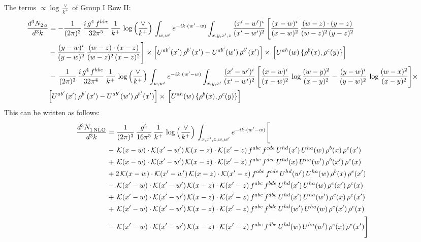 \documentclass[9pt]{article}
\numberwithin{equation}{section}
\begin{document}
{\color{blue}\noindent The terms $\propto\log\frac{\vee}{k^+}$ of Group I Row II:
\begin{align}
\frac{d^{3}N_{2\,a}}{d^{3}k} & =  -\frac{1}{(2\pi)^{3}}\,\frac{i\,g^{4}\,f^{hbc}}{32\pi^{5}}\,\frac{1}{k^{+}}\,\log{\left(\frac{\vee}{k^{+}}\right)}\,
\int_{w,w'} e^{-ik\cdot(w'-w)}\int_{x,y,x',z}\frac{(x'-w')^{i}}{(x'-w')^{2}}\,\Bigg[\frac{(x-w)^{i}}{(x-w)^{2}}\, \frac{(w-z)\cdot (y-z)}{(w-z)^{2}\,(y-z)^{2}}\notag \\ & - \frac{(y-w)^{i}}{(y-w)^{2}}\, \frac{(w-z)\cdot (x-z)}{(w-z)^{2}\,(x-z)^{2}}\Bigg]\times\Big[U^{ab'}(x')\,\rho^{b'}(x')-U^{ab'}(w')\,\rho^{b'}(x')\Big]\times\, \Big[U^{ah}(w)\,\{\rho^{b}(x),\rho^{c}(y)\}\Big] \notag \\
& -\,\frac{1}{(2\pi)^{3}}\,\frac{i\,g^{4}\,f^{hbc}}{32\pi^{4}}\,\frac{1}{k^{+}}\,\log{\left(\frac{\vee}{k^{+}}\right)}\,
\int_{w,w'} e^{-ik\cdot(w'-w)}\int_{x,y,x'}\frac{(x'-w')^{i}}{(x'-w')^{2}}\,\Bigg[\frac{(x-w)^{i}}{(x-w)^{2}}\,\log\frac{(w-y)^{2}}{(x-y)^{2}}-\frac{(y-w)^{i}}{(y-w)^{2}}\,\log\frac{(w-x)^{2}}{(x-y)^{2}}\Bigg]\times\notag \\ & \Big[U^{ab'}(x')\,\rho^{b'}(x')-U^{ab'}(w')\,\rho^{b'}(x')\Big]\times\, \Big[U^{ah}(w)\,\{\rho^{b}(x),\rho^{c}(y)\}\Big]
\end{align}}
This can be written as follows: 
\begin{align}
\frac{d^{3}N_{1\,\rm NLO}^{\rm}}{d^{3}k}  & = \frac{1}{(2\pi)^{3}}\,\frac{g^{4}}{16\pi^{5}}\,\frac{1}{k^{+}}\,\log{\left(\frac{\vee}{k^{+}}\right)}\, \int_{x,x',z,w,w'}e^{-ik\cdot(w'-w)}\Bigg[\notag\\
&-\,\mathcal{K}(x-w)\cdot\mathcal{K}(x'-w')\,\mathcal{K}(x-z)\cdot\mathcal{K}(x'-z)\,f^{abc}\,f^{cde}\,U^{hd}(x')\,U^{ha}(w)\,\rho^{b}(x)\,\rho^{e}(x')\notag\\
&+\,\mathcal{K}(x-w)\cdot\mathcal{K}(x'-w')\,\mathcal{K}(x-z)\cdot\mathcal{K}(x'-z)\,f^{abc}\,f^{dce}\,U^{hd}(x)\,U^{ha}(w')\,\rho^{b}(x')\,\rho^{e}(x)\notag\\
&+2\,\mathcal{K}(x-w)\cdot\mathcal{K}(x'-w')\,\mathcal{K}(x-z)\cdot\mathcal{K}(x'-z)\,f^{abc}\,f^{cde}\,U^{hd}(w')\,U^{ha}(w)\,\rho^{b}(x)\,\rho^{e}(x')\notag\\
&-\,\mathcal{K}(x'-w)\cdot\mathcal{K}(x'-w')\,\mathcal{K}(x-z)\cdot\mathcal{K}(x'-z)\,f^{abc}\,f^{bde}\,U^{hd}(x')\,U^{ha}(w)\,\rho^{e}(x')\,\rho^{c}(x)\notag\\
&+\,\mathcal{K}(x'-w)\cdot\mathcal{K}(x'-w')\,\mathcal{K}(x-z)\cdot\mathcal{K}(x'-z)\,f^{abc}\,f^{dbe}\,U^{hd}(x')\,U^{ha}(w')\,\rho^{c}(x)\,\rho^{e}(x')\notag\\
&+\,\mathcal{K}(x'-w)\cdot\mathcal{K}(x'-w')\,\mathcal{K}(x-z)\cdot\mathcal{K}(x'-z)\,f^{abc}\,f^{bde}\,U^{hd}(w')\,U^{ha}(w)\,\rho^{e}(x')\,\rho^{c}(x)\notag\\
&-\,\mathcal{K}(x'-w)\cdot\mathcal{K}(x'-w')\,\mathcal{K}(x-z)\cdot\mathcal{K}(x'-z)\,f^{abc}\,f^{dbe}\,U^{hd}(w)\,U^{ha}(w')\,\rho^{c}(x)\,\rho^{e}(x')\Bigg]
\end{align}
\end{document}
